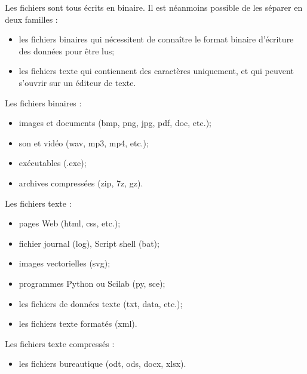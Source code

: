 \documentclass[10pt,fleqn]{article} %
\begin{document}
\begin{minipage}[c]{.6\linewidth}

Les fichiers sont tous écrits en binaire. Il est néanmoins possible de les séparer en deux familles :
\begin{itemize}
\item les fichiers binaires qui nécessitent de connaître le format binaire d'écriture des données pour être lus;
\item les fichiers texte qui contiennent des caractères uniquement, et qui peuvent s'ouvrir sur un éditeur de texte.
\end{itemize}

\begin{exemple}

Les fichiers binaires :

\begin{itemize}
\item images et documents (bmp, png, jpg, pdf, doc, etc.);
\item son et vidéo (wav, mp3, mp4, etc.);
\item exécutables (.exe);
\item archives compressées (zip, 7z, gz).
\end{itemize}

Les fichiers texte :

\begin{itemize}
\item pages Web (html, css, etc.);
\item fichier journal (log), Script shell (bat);
\item images vectorielles (svg);
\item programmes Python ou Scilab (py, sce);
\item les fichiers de données texte (txt, data, etc.);
\item les fichiers texte formatés (xml).
\end{itemize}

Les fichiers texte compressés :
\begin{itemize}
\item les fichiers bureautique (odt, ods, docx, xlsx).
\end{itemize}
\end{exemple}

\end{minipage} \hfill
\end{document}
